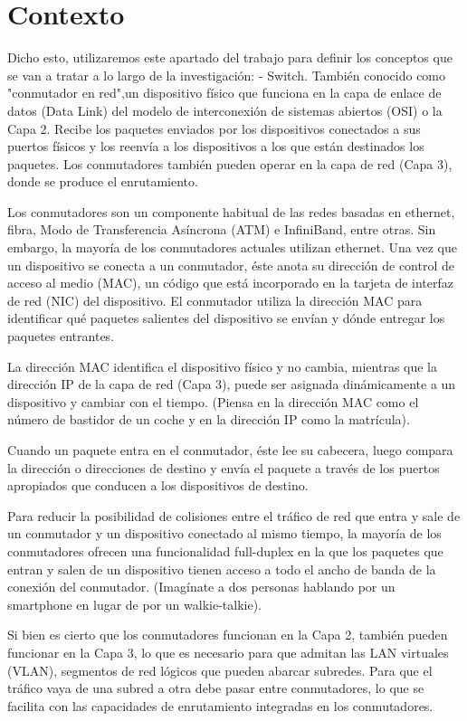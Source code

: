 \documentclass[a4paper, 12pt]{book}
\begin{document}
	\section{Contexto}
	\label{chap:estado}
	Dicho esto, utilizaremos este apartado del trabajo para definir los conceptos que se van a tratar a lo largo de la investigación:
	- Switch. También conocido como "conmutador en red",un dispositivo físico que funciona en la capa de enlace de datos (Data Link) del modelo de interconexión de sistemas abiertos (OSI) o la Capa 2. Recibe los paquetes enviados por los dispositivos conectados a sus puertos físicos y los reenvía a los dispositivos a los que están destinados los paquetes. Los conmutadores también pueden operar en la capa de red (Capa 3), donde se produce el enrutamiento.
	
	Los conmutadores son un componente habitual de las redes basadas en ethernet, fibra, Modo de Transferencia Asíncrona (ATM) e InfiniBand, entre otras. Sin embargo, la mayoría de los conmutadores actuales utilizan ethernet. Una vez que un dispositivo se conecta a un conmutador, éste anota su dirección de control de acceso al medio (MAC), un código que está incorporado en la tarjeta de interfaz de red (NIC) del dispositivo. El conmutador utiliza la dirección MAC para identificar qué paquetes salientes del dispositivo se envían y dónde entregar los paquetes entrantes.
	
	La dirección MAC identifica el dispositivo físico y no cambia, mientras que la dirección IP de la capa de red (Capa 3), puede ser asignada dinámicamente a un dispositivo y cambiar con el tiempo. (Piensa en la dirección MAC como el número de bastidor de un coche y en la dirección IP como la matrícula).
	
	Cuando un paquete entra en el conmutador, éste lee su cabecera, luego compara la dirección o direcciones de destino y envía el paquete a través de los puertos apropiados que conducen a los dispositivos de destino.
	
	Para reducir la posibilidad de colisiones entre el tráfico de red que entra y sale de un conmutador y un dispositivo conectado al mismo tiempo, la mayoría de los conmutadores ofrecen una funcionalidad full-duplex en la que los paquetes que entran y salen de un dispositivo tienen acceso a todo el ancho de banda de la conexión del conmutador. (Imagínate a dos personas hablando por un smartphone en lugar de por un walkie-talkie).
	
	Si bien es cierto que los conmutadores funcionan en la Capa 2, también pueden funcionar en la Capa 3, lo que es necesario para que admitan las LAN virtuales (VLAN), segmentos de red lógicos que pueden abarcar subredes. Para que el tráfico vaya de una subred a otra debe pasar entre conmutadores, lo que se facilita con las capacidades de enrutamiento integradas en los conmutadores. 
	
\end{document}
